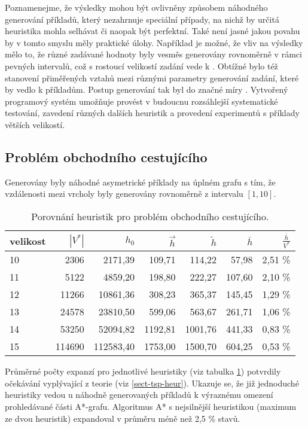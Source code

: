 \documentclass[12pt,notitlepage,fleqn]{report} %
\theoremstyle{definition}
\begin{document}
Poznamenejme, že výsledky mohou být ovlivněny způsobem náhodného generování příkladů, který nezahrnuje speciální případy, na nichž by určitá heuristika mohla selhávat či naopak být perfektní. Také není jasné jakou povahu by v tomto smyslu měly praktické úlohy. Například je možné, že vliv na výsledky mělo to, že různé zadávané hodnoty byly vesměs generovány rovnoměrně v rámci pevných intervalů, což s rostoucí velikostí zadání vede k . Obtížné bylo též stanovení přiměřených vztahů mezi různými parametry generování zadání, které by vedlo k  příkladům. Postup generování tak byl do značné míry . Vytvořený programový systém umožňuje provést v budoucnu rozsáhlejší systematické testování, zavedení různých dalších heuristik a provedení experimentů s příklady větších velikostí.

\subsection{Problém obchodního cestujícího}
Generovány byly náhodné asymetrické příklady na úplném grafu s tím, že vzdálenosti mezi vrcholy byly generovány rovnoměrně z intervalu $[1,10]$.
\begin{table}[h]
\begin{center}
\begin{tabular}{l|rrrrrr}
velikost & $|V^*|$ & $h_0$ & $\overrightarrow{h}$ & $\overleftarrow{h}$ & $\overline{h}$ & $\frac{\overline{h}}{V^*}$ \\ \hline
10&2306  &2171,39  &109,71  &114,22  &57,98   &2,51 \%\\
11&5122  &4859,20  &198,80  &222,27  &107,60  &2,10 \%\\
12&11266 &10861,36 &308,23  &365,37  &145,45  &1,29 \%\\
13&24578 &23810,50 &599,06  &563,67  &261,71  &1,06 \%\\
14&53250 &52094,82 &1192,81 &1001,76 &441,33  &0,83 \%\\
15&114690&112583,40&1753,00 &1500,70 &604,25  &0,53 \%
\end{tabular}
\end{center}
\caption{Porovnání heuristik pro problém obchodního cestujícího.}
\label{tab-heur-tsp}
\end{table}
Průměrné počty expanzí pro jednotlivé heuristiky (viz tabulka \ref{tab-heur-tsp}) potvrdily očekávání vyplývající z teorie (viz \ref{sect-tsp-heur}). Ukazuje se, že již jednoduché heuristiky vedou u náhodně generovaných příkladů k výraznému omezení prohledávané části A*-grafu. Algoritmus A* s nejsilnější heuristikou (maximum ze dvou  heuristik) expandoval v průměru méně než 2,5 \% stavů.
\end{document}
